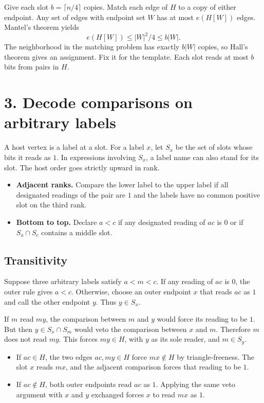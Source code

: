 \documentclass[11pt,a4paper]{article}
\newcommand{\tightlist}{\setlength{\itemsep}{2pt}\setlength{\parskip}{0pt}}
\begin{document}
Give each slot \(b=\lceil n/4\rceil\) copies. Match each edge of \(H\)
to a copy of either endpoint. Any set of edges with endpoint set \(W\)
has at most \(e(H[W])\) edges. Mantel's theorem yields \[
e(H[W])\le |W|^2/4\le b|W|.
\] The neighborhood in the matching problem has exactly \(b|W|\) copies,
so Hall's theorem gives an assignment. Fix it for the template. Each
slot reads at most \(b\) bits from pairs in \(H\).

\newpage

\section{3. Decode comparisons on arbitrary
labels}\label{decode-comparisons-on-arbitrary-labels}

A host vertex is a label at a slot. For a label \(x\), let \(S_x\) be
the set of slots whose bits it reads as \(1\). In expressions involving
\(S_x\), a label name can also stand for its slot. The host order goes
strictly upward in rank.

\begin{itemize}
\tightlist
\item
  \textbf{Adjacent ranks.} Compare the lower label to the upper label if
  all designated readings of the pair are \(1\) and the labels have no
  common positive slot on the third rank.
\item
  \textbf{Bottom to top.} Declare \(a<c\) if any designated reading of
  \(ac\) is \(0\) or if \(S_a\cap S_c\) contains a middle slot.
\end{itemize}

\subsection{Transitivity}\label{transitivity}

Suppose three arbitrary labels satisfy \(a<m<c\). If any reading of
\(ac\) is \(0\), the outer rule gives \(a<c\). Otherwise, choose an
outer endpoint \(x\) that reads \(ac\) as \(1\) and call the other
endpoint \(y\). Thus \(y\in S_x\).

If \(m\) read \(my\), the comparison between \(m\) and \(y\) would force
its reading to be \(1\). But then \(y\in S_x\cap S_m\) would veto the
comparison between \(x\) and \(m\). Therefore \(m\) does not read
\(my\). This forces \(my\in H\), with \(y\) as its sole reader, and
\(m\in S_y\).

\begin{itemize}
\tightlist
\item
  If \(ac\in H\), the two edges \(ac,my\in H\) force \(mx\notin H\) by
  triangle-freeness. The slot \(x\) reads \(mx\), and the adjacent
  comparison forces that reading to be \(1\).
\item
  If \(ac\notin H\), both outer endpoints read \(ac\) as \(1\). Applying
  the same veto argument with \(x\) and \(y\) exchanged forces \(x\) to
  read \(mx\) as \(1\).
\end{itemize}
\end{document}
